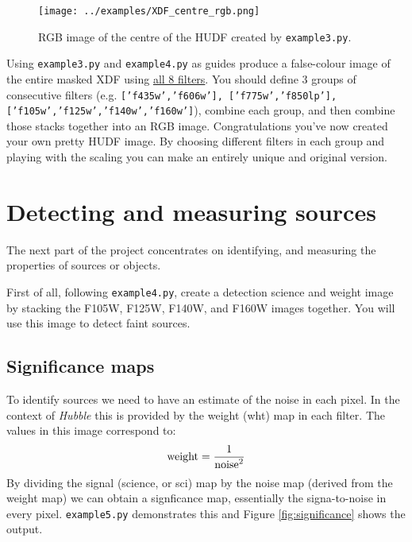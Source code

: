 \documentclass{article}
\begin{document}
\begin{figure}\label{fig:centre_rgb}
	\centering
	\texttt{[image: ../examples/XDF\_centre\_rgb.png]}
	\caption{RGB image of the centre of the HUDF created by \texttt{example3.py}.}
\end{figure}

\begin{question}
Using  \texttt{example3.py} and \texttt{example4.py} as guides produce a false-colour image of the entire masked XDF using \underline{all 8 filters}. You should define 3 groups of consecutive filters (e.g. \texttt{['f435w','f606w'], ['f775w','f850lp'], ['f105w','f125w','f140w','f160w']}), combine each group, and then combine those stacks together into an RGB image. Congratulations you've now created your own pretty HUDF image. By choosing different filters in each group and playing with the scaling you can make an entirely unique and original version.
\end{question}









\setcounter{Question}{0}
\section{Detecting and measuring sources}

The next part of the project concentrates on identifying, and measuring the properties of sources or objects.

\begin{question}
First of all, following \texttt{example4.py}, create a detection science and weight image by stacking the F105W, F125W, F140W, and F160W images together. You will use this image to detect faint sources.
\end{question}

\subsection{Significance maps}

To identify sources we need to have an estimate of the noise in each pixel. In the context of {\em Hubble} this is provided by the weight (wht) map in each filter. The values in this image correspond to:
\[
{\rm weight} = \frac{1}{{\rm noise}^2}
\]
By dividing the signal (science, or sci) map by the noise map (derived from the weight map) we can obtain a signficance map, essentially the signa-to-noise in every pixel. \texttt{example5.py} demonstrates this and Figure \ref{fig:significance} shows the output.
\end{document}
